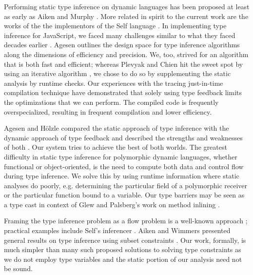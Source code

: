 Performing static type inference on dynamic languages has been proposed at
least as early as Aiken and Murphy \cite{Aiken91}. More related in spirit to
the current work are the works of the the implementors of the Self language
\cite{Ungar87}. In implementing type inference for JavaScript, we faced many
challenges similar to what they faced decades earlier \cite{Ungar92,
  Agesen94}. Agesen outlines the design space for type inference algorithms
along the dimensions of efficiency and precision. We, too, strived for an
algorithm that is both fast and efficient; whereas Plevyak and Chien hit the
sweet spot by using an iterative algorithm \cite{Plevyak93}, we chose to do so
by supplementing the static analysis by runtime checks. Our experiences with
the tracing just-in-time compilation technique \cite{GalVEE09, GalPLDI09} have
demonstrated that solely using type feedback limits the optimizations that we
can perform. The compiled code is frequently overspecialized, resulting
in frequent compilation and lower efficiency.

Agesen and H\"olzle compared the static approach of type inference with the
dynamic approach of type feedback and described the strengths and weaknesses
of both \cite{Agesen95}. Our system tries to achieve the best of both
worlds. The greatest difficulty in static type inference for polymorphic
dynamic languages, whether functional or object-oriented, is the need to
compute both data and control flow during type inference. We solve this by
using runtime information where static analyses do poorly,
e.g. determining the particular field of a polymorphic receiver or the
particular function bound to a variable. Our type barriers may be seen as a
type cast in context of Glew and
Palsberg's work on method inlining \cite{Glew02}.

Framing the type inference problem as a flow problem is a well-known approach
\cite{Oxhoj92, Palsberg91}; practical examples include Self's inferencer
\cite{Agesen93TI}.
Aiken and Wimmers presented general results on
type inference using subset constraints \cite{Aiken93}.
Our work, formally, is much simpler than many such
proposed solutions to solving type constraints as we do not employ type
variables and the static portion of our analysis need not be sound.

